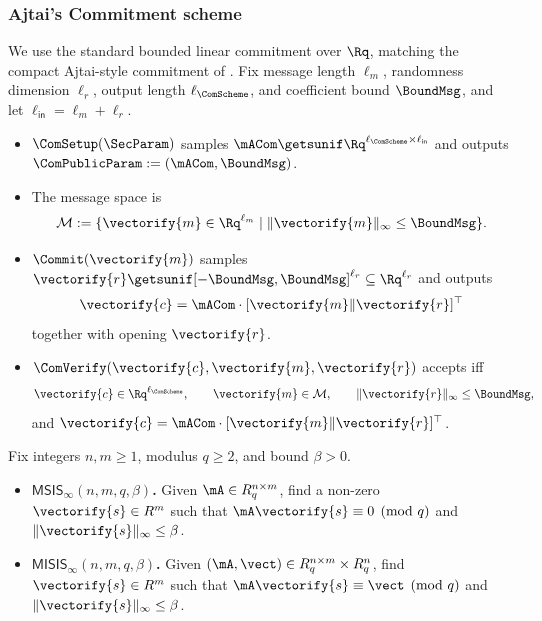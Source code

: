 \subsubsection{Ajtai's Commitment scheme}
We use the standard bounded linear commitment over \(\Rq\), matching the compact Ajtai-style commitment of
\cite[Definition~13]{EPRINT:AttCraKoh21}. Fix message length \(\ell_m\), randomness dimension \(\ell_r\), output length
\(\ell_{\ComScheme}\), and coefficient bound \(\BoundMsg\), and let \(\ell_{\mathsf{in}}=\ell_m+\ell_r\).
\begin{itemize}
  \item \(\ComSetup(\SecParam)\) samples \(\mACom\getsunif \Rq^{\ell_{\ComScheme}\times \ell_{\mathsf{in}}}\) and outputs
  \(\ComPublicParam:=(\mACom,\BoundMsg)\).
  \item The message space is
  \[
    \mathcal{M}:=\{\vectorify{m}\in\Rq^{\ell_m}\mid \|\vectorify{m}\|_\infty\le \BoundMsg\}.
  \]
  \item \(\Commit(\vectorify{m})\) samples
  \(\vectorify{r}\getsunif[-\BoundMsg,\BoundMsg]^{\ell_r}\subseteq\Rq^{\ell_r}\) and outputs
  \[
    \vectorify{c}=\mACom\cdot[\vectorify{m}\Vert \vectorify{r}]^\top
  \]
  together with opening \(\vectorify{r}\).
  \item \(\ComVerify(\vectorify{c},\vectorify{m},\vectorify{r})\) accepts iff
  \[
    \vectorify{c}\in\Rq^{\ell_{\ComScheme}},\qquad
    \vectorify{m}\in\mathcal{M},\qquad
    \|\vectorify{r}\|_\infty\le \BoundMsg,
  \]
  and \(\vectorify{c}=\mACom\cdot[\vectorify{m}\Vert \vectorify{r}]^\top\).
\end{itemize}

\begin{definition}\label{def:sis-isis}
Fix integers \(n,m\ge 1\), modulus \(q\ge 2\), and bound \(\beta>0\).
\begin{itemize}[leftmargin=1.25em]
  \item \textbf{\(\mathsf{MSIS}_\infty(n,m,q,\beta)\).} Given \(\mA\in R_q^{n\times m}\), find a non-zero
  \(\vectorify{s}\in R^m\) such that \(\mA\vectorify{s}\equiv 0 \pmod q\) and \(\|\vectorify{s}\|_\infty\le \beta\).
  \item \textbf{\(\mathsf{MISIS}_\infty(n,m,q,\beta)\).} Given \((\mA,\vect)\in R_q^{n\times m}\times R_q^n\), find
  \(\vectorify{s}\in R^m\) such that \(\mA\vectorify{s}\equiv \vect \pmod q\) and
  \(\|\vectorify{s}\|_\infty\le \beta\).
\end{itemize}
\end{definition}

